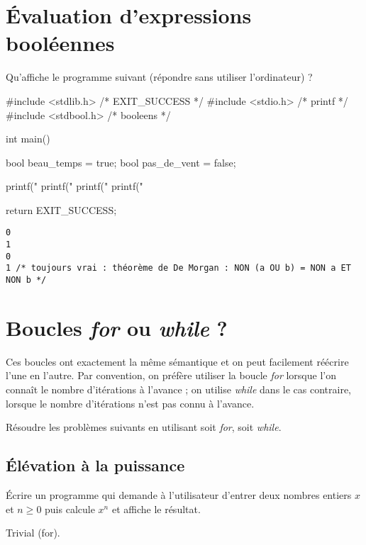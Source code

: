 
\newcommand{\commentaire}[1]{}

\vspace{-1cm}

\section{Évaluation d'expressions booléennes}
\label{intro}

Qu'affiche le programme suivant (répondre sans utiliser l'ordinateur) ?
{\small
\begin{listing}{1}
#include <stdlib.h> /* EXIT_SUCCESS */
#include <stdio.h> /* printf */
#include <stdbool.h> /* booleens */

int main()
{
    bool beau_temps = true;
    bool pas_de_vent = false;

    printf("%
    printf("%
    printf("%
    printf("%

    return EXIT_SUCCESS;
}
\end{listing}
}

\begin{correction}
\begin{verbatim}
0
1
0
1 /* toujours vrai : théorème de De Morgan : NON (a OU b) = NON a ET NON b */
\end{verbatim}
\end{correction}


\section{Boucles \textit{for} ou \textit{while} ?}

Ces boucles ont exactement la même sémantique et on peut facilement
réécrire l'une en l'autre. Par convention, on préfère utiliser la
boucle \textit{for} lorsque l'on connaît le nombre d'itérations à
l'avance ; on utilise \textit{while} dans le cas contraire, lorsque le nombre
d'itérations n'est pas connu à l'avance.

Résoudre les problèmes suivants en utilisant soit \textit{for}, soit \textit{while}.

\subsection{Élévation à la puissance}
Écrire un programme  qui demande à l'utilisateur d'entrer deux nombres
entiers $x$ et $n \geq 0$ puis calcule $x^n$ et affiche le résultat.
\begin{correction}
Trivial (for).
\end{correction}

